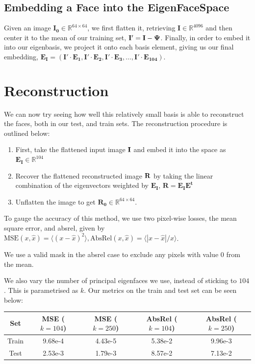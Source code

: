 \documentclass[article]{article}
\begin{document}

\subsection{Embedding a Face into the EigenFaceSpace}

Given an image $\mathbf{I_0} \in \mathbb{R}^{64\times 64}$, we first flatten it, retrieving $\mathbf{I} \in \mathbb{R}^{4096}$ and then center it to the mean of our training set, $\bf I' = I - \Psi$. Finally, in order to embed it into our eigenbasis, we project it onto each basis element, giving us our final embedding, $\mathbf{E_I = (I'\cdot E_1, I'\cdot E_2, I'\cdot E_3, \dots, I'\cdot E_{104})}$.

\section{Reconstruction}

We can now try seeing how well this relatively small basis is able to reconstruct the faces, both in our test, and train sets. The reconstruction procedure is outlined below:

\begin{enumerate}
    \item First, take the flattened input image $\bf I$ and embed it into the space as $\mathbf{E_I} \in \mathbb{R}^{104}$
    \item Recover the flattened reconstructed image $\bf R$ by taking the linear combination of the eigenvectors weighted by $\mathbf{E_I}$, $\mathbf{R} = \mathbf{E_I}\mathbf{E^t}$
    \item Unflatten the image to get $\mathbf{R_0} \in \mathbb{R}^{64\times 64}$.
\end{enumerate}

To gauge the accuracy of this method, we use two pixel-wise losses, the mean square error, and absrel, given by $\text{MSE}(x, \hat{x}) = \langle(x - \hat{x})^2\rangle, \text{AbsRel}(x, \hat{x}) = \langle|x - \hat{x}|/x\rangle$.\bigskip

We use a valid mask in the absrel case to exclude any pixels with value $0$ from the mean.\bigskip

We also vary the number of principal eigenfaces we use, instead of sticking to $104$. This is parametrised as $k$. Our metrics on the train and test set can be seen below:

\begin{center}
    \begin{tabular}{|c|c|c|c|c|}
        \hline \textbf{Set} & \textbf{MSE ($k = 104$)} & \textbf{MSE ($k = 250$)} & \textbf{AbsRel ($k = 104$)} & \textbf{AbsRel ($k = 250$)} \\
        \hline Train & 9.68e-4 & 4.43e-5 & 5.38e-2 & 9.96e-3 \\
        \hline Test & 2.53e-3 & 1.79e-3 & 8.57e-2 & 7.13e-2\\
        \hline
    \end{tabular}    
\end{center}
\end{document}
